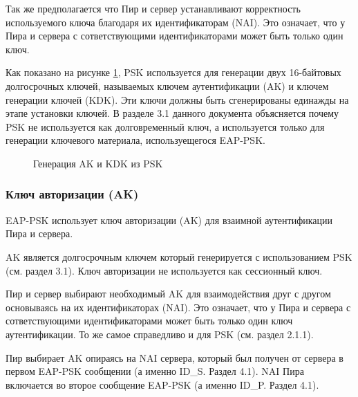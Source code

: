 Так же предполагается что Пир и сервер устанавливают корректность используемого ключа благодаря их идентификаторам (NAI). Это означает, что у Пира и сервера с сответствующими идентификаторами может быть только один ключ.

Как показано на рисунке \ref{img:ak_kdk_psk}, PSK используется для генерации двух 16-байтовых долгосрочных ключей, называемых ключем аутентификации (AK) и ключем генерации ключей (KDK). Эти ключи должны быть сгенерированы единажды на этапе установки ключей. В разделе 3.1 данного документа объясняется почему PSK не используется как долговременный ключ, а используется только для генерации ключевого материала, используещегося EAP-PSK.

\begin{figure}[h!]
\caption{Генерация AK и KDK из PSK}
\label{img:ak_kdk_psk}
\end{figure}

\subsubsection{Ключ авторизации (AK)}

EAP-PSK использует ключ авторизации (AK) для взаимной аутентификации Пира и сервера. 

AK является долгосрочным ключем который генерируется с использованием PSK (см. раздел 3.1). Ключ авторизации не используется как сессионный ключ.

Пир и сервер выбирают необходимый AK для взаимодействия друг с другом основываясь на их идентификаторах (NAI). Это означает, что у Пира и сервера с сответствующими идентификаторами может быть только один ключ аутентификации. То же самое справедливо и для PSK (см. раздел 2.1.1).

Пир выбирает AK опираясь на NAI сервера, который был получен от сервера в первом EAP-PSK сообщении (а именно ID\_S. Раздел 4.1). NAI Пира включается во второе сообщение EAP-PSK (а именно ID\_P. Раздел 4.1).

